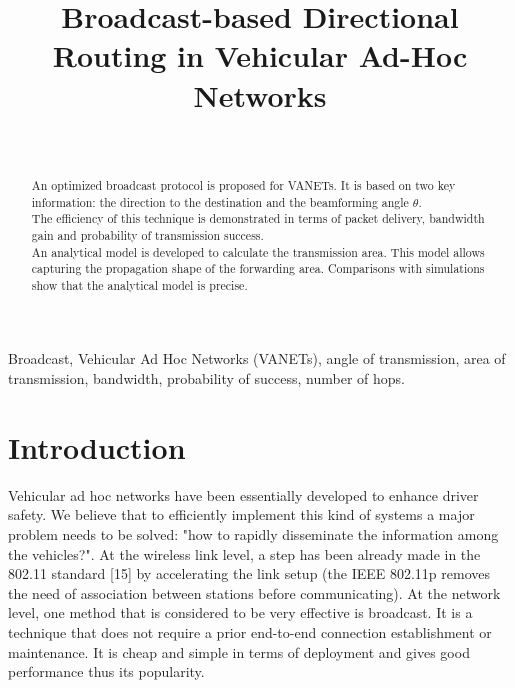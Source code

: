 \documentclass{IEEEtran}
\begin{document}
\title{Broadcast-based Directional Routing in Vehicular Ad-Hoc Networks}


{
\author{\\
}
}

\maketitle

\begin{abstract}
An optimized broadcast protocol is proposed for VANETs. It is based
on two key information: the direction to the destination and
the beamforming angle $\theta$.\\
The efficiency of this technique is demonstrated in terms of packet
delivery, bandwidth gain and probability of transmission success.\\
An analytical model is developed to calculate the transmission area.
This model allows capturing the propagation shape of the forwarding
area. Comparisons with simulations show that the analytical model is
precise.\\

\end{abstract}

\begin{keywords}
Broadcast, Vehicular Ad Hoc Networks (VANETs), angle of
transmission, area of transmission, bandwidth, probability of
success, number of hops.
\end{keywords}

\IEEEpeerreviewmaketitle

\section{Introduction}


Vehicular ad hoc networks have been essentially developed  to
enhance driver safety. We believe that to efficiently implement this
kind of systems a major problem needs to be solved: "how to rapidly
disseminate the information among the vehicles?". At the wireless
link level, a step has been already made in the 802.11 standard [15]
by accelerating the link setup (the IEEE 802.11p removes the need of
association between stations before communicating). At the network
level, one method that is considered to be very effective is
broadcast. It is a technique that does not require a prior
end-to-end connection establishment or maintenance. It is cheap and
simple in terms of deployment
and gives good performance thus its popularity.\\
\end{document}
